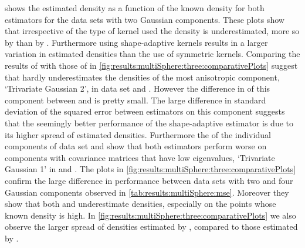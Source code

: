 	 shows the estimated density as a function of the known density for both estimators for the data sets with two Gaussian components. These plots show that irrespective of the type of kernel used the density is underestimated, more so by \mbe than by \sambe. Furthermore using shape-adaptive kernels results in a larger variation in estimated densities than the use of symmetric kernels. 
		Comparing the results of \sambe with those of \mbe in \cref{fig:results:multiSphere:three:comparativePlots} suggest that \sambe hardly underestimates the densities of the most anisotropic component, \ie `Trivariate Gaussian 2', in data set \ferdosiTwo and \baakmanTwo. However the difference in \mse of this component between \mbe and \sambe is pretty small. The large difference in standard deviation of the squared error between estimators on this component suggests that the seemingly better performance of the shape-adaptive estimator is due to its higher spread of estimated densities.
		Furthermore the \mses of the individual components of data set \ferdosiTwo and \baakmanThree show that both estimators perform worse on components with covariance matrices that have low eigenvalues, \eg `Trivariate Gaussian 1' in \ferdosiTwo and \baakmanThree.
	The plots in \cref{fig:results:multiSphere:three:comparativePlots} confirm the large difference in performance between data sets with two and four Gaussian components observed in \cref{tab:results:multiSphere:mse}. Moreover they show that both \mbe and \sambe underestimate densities, especially on the points whose known density is high. In \cref{fig:results:multiSphere:three:comparativePlots} we also observe the larger spread of densities estimated by \sambe, compared to those estimated by \mbe.

